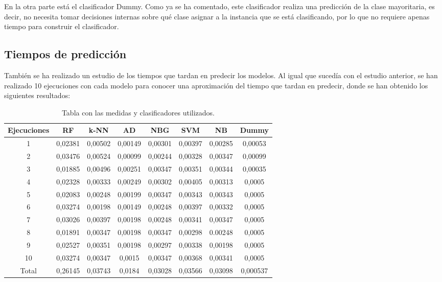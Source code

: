 En la otra parte está el clasificador Dummy. Como ya se ha comentado, este clasificador realiza una predicción de la clase mayoritaria, es decir, no necesita tomar decisiones internas sobre qué clase asignar a la instancia que se está clasificando, por lo que no requiere apenas tiempo para construir el clasificador.

\subsection{Tiempos de predicción}
También se ha realizado un estudio de los tiempos que tardan en predecir los modelos. Al igual que sucedía con el estudio anterior, se han realizado 10 ejecuciones con cada modelo para conocer una aproximación del tiempo que tardan en predecir, donde se han obtenido los siguientes resultados:

\begin{table}[h]
	\begin{center}
		\begin{tabular}{| c | c | c | c | c | c | c | c |}
			\hline
			Ejecuciones & RF & k-NN & AD & NBG & SVM & NB & Dummy \\ \hline
			1 & 0,02381 & 0,00502 & 0,00149 & 0,00301 & 0,00397 & 0,00285 & 0,00053 \\
			2 & 0,03476 & 0,00524 & 0,00099 & 0,00244 & 0,00328 & 0,00347 & 0,00099 \\ 
			3 & 0,01885 & 0,00496 & 0,00251 & 0,00347 & 0,00351 & 0,00344 & 0,00035 \\
			4 & 0,02328 & 0,00333 & 0,00249 & 0,00302 & 0,00405 & 0,00313 & 0,0005 \\
			5 & 0,02083 & 0,00248 & 0,00199 & 0,00347 & 0,00343 & 0,00343 & 0,0005 \\
			6 & 0,03274 & 0,00198 & 0,00149 & 0,00248 & 0,00397 & 0,00332 & 0,0005 \\
			7 & 0,03026 & 0,00397 & 0,00198 & 0,00248 & 0,00341 & 0,00347 & 0,0005 \\
			8 & 0,01891 & 0,00347 & 0,00198 & 0,00347 & 0,00298 & 0.00248 & 0,0005 \\
			9 & 0,02527 & 0,00351 & 0,00198 & 0,00297 & 0,00338 & 0,00198 & 0,0005 \\
			10 & 0,03274 & 0,00347 & 0,0015 & 0,00347 & 0,00368 & 0,00341 & 0,0005 \\ \hline
			Total & 0,26145 & 0,03743 & 0,0184 & 0,03028 & 0,03566 & 0,03098 & 0,000537 \\ \hline
		\end{tabular}
		\caption{Tabla con las medidas y clasificadores utilizados.}
		\label{tab:tiempos_pred}
	\end{center}
\end{table}
 
